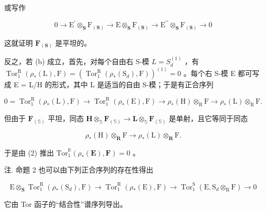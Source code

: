 或写作

\[
0 \rightarrow \mathrm{E} ^ {\prime} \otimes_ {\mathbf {S}} \mathrm{F} _ {(\mathbf {S})} \rightarrow \mathrm{E} \otimes_ {\mathbf {S}} \mathrm{F} _ {(\mathbf {S})} \rightarrow \mathrm{E} ^ {\prime \prime} \otimes_ {\mathbf {S}} \mathrm{F} _ {(\mathbf {S})} \rightarrow 0
\]

这就证明 \(\mathbf{F}_{(\mathbf{S})}\) 是平坦的。

反之，若 (b) 成立，首先，对每个自由右 S-模 \(L = S_{d}^{(1)}\) ，有 \(\operatorname{Tor}_{1}^{\mathrm{R}}(\rho_{*}(\mathrm{L}), \mathrm{F}) = (\operatorname{Tor}_{1}^{\mathrm{R}}(\rho_{*}(\mathrm{S}_{d}), \mathrm{F}))^{(1)} = 0\) 。每个右 S-模 E 都可写成 E = L/H 的形式，其中 L 是适当的自由 S-模；于是有正合序列

\[
0 = \operatorname{Tor} _ {1} ^ {\mathrm{R}} (\rho_ {*} (\mathrm{L}), \mathrm{F}) \rightarrow \operatorname{Tor} _ {1} ^ {\mathrm{R}} (\rho_ {*} (\mathrm{E}), \mathrm{F}) \rightarrow \rho_ {*} (\mathrm{H}) \otimes_ {\mathrm{R}} \mathrm{F} \rightarrow \rho_ {*} (\mathrm{L}) \otimes_ {\mathrm{R}} \mathrm{F}. \tag {2}
\]

但由于 \(\mathbf{F}_{(\mathbb{S})}\) 平坦，同态 \(\mathbf{H} \otimes_{\mathbb{S}} \mathbf{F}_{(\mathbb{S})} \to \mathbf{L} \otimes_{\mathbb{S}} \mathbf{F}_{(\mathbb{S})}\) 是单射，且它等同于同态

\[
\rho_ {*} (\mathrm{H}) \otimes_ {\mathbf {R}} \mathrm{F} \rightarrow \rho_ {*} (\mathrm{L}) \otimes_ {\mathbf {R}} \mathrm{F}.
\]

于是由 (2) 推出 \(\mathrm{Tor}_1^{\mathbb{R}}(\rho_*(\mathbf{E}),\mathbf{F}) = 0\) 。

注. 命题 2 也可以由下列正合序列的存在性得出

\[
\mathrm{E} \otimes_ {\mathbf {S}} \operatorname{Tor} _ {1} ^ {\mathrm{R}} (\rho_ {*} (\mathrm{S} _ {d}), \mathrm{F}) \rightarrow \operatorname{Tor} _ {1} ^ {\mathrm{R}} (\rho_ {*} (\mathrm{E}), \mathrm{F}) \rightarrow \operatorname{Tor} _ {1} ^ {\mathrm{S}} (\mathrm{E}, \mathrm{S} _ {d} \otimes_ {\mathrm{R}} \mathrm{F}) \rightarrow 0
\]

它由 Tor 函子的``结合性''谱序列导出。

